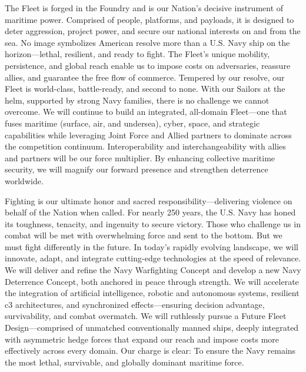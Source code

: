 \documentclass[../main.tex]{subfiles}
\begin{document}
\begin{description}[style=nextline, labelsep=0.5em, font=\bfseries]
\begin{description}[style=nextline, labelsep=0.5em, font=\bfseries]
          \item[\textbf{Fleet.}] The Fleet is forged in the Foundry and is our Nation's decisive instrument of maritime power. Comprised of people, platforms, and payloads, it is designed to deter aggression, project power, and secure our national interests on and from the sea. No image symbolizes American resolve more than a U.S. Navy ship on the horizon---lethal, resilient, and ready to fight. The Fleet's unique mobility, persistence, and global reach enable us to impose costs on adversaries, reassure allies, and guarantee the free flow of commerce. Tempered by our resolve, our Fleet is world-class, battle-ready, and second to none. With our Sailors at the helm, supported by strong Navy families, there is no challenge we cannot overcome. We will continue to build an integrated, all-domain Fleet---one that fuses maritime (surface, air, and undersea), cyber, space, and strategic capabilities while leveraging Joint Force and Allied partners to dominate across the competition continuum. Interoperability and interchangeability with allies and partners will be our force multiplier. By enhancing collective maritime security, we will magnify our forward presence and strengthen deterrence worldwide.

          \item[\textbf{Fight.}] Fighting is our ultimate honor and sacred responsibility---delivering violence on behalf of the Nation when called. For nearly 250 years, the U.S. Navy has honed its toughness, tenacity, and ingenuity to secure victory. Those who challenge us in combat will be met with overwhelming force and sent to the bottom. But we must fight differently in the future. In today's rapidly evolving landscape, we will innovate, adapt, and integrate cutting-edge technologies at the speed of relevance. We will deliver and refine the Navy Warfighting Concept and develop a new Navy Deterrence Concept, both anchored in peace through strength. We will accelerate the integration of artificial intelligence, robotic and autonomous systems, resilient \ac{c3} architectures, and synchronized effects---ensuring decision advantage, survivability, and combat overmatch. We will ruthlessly pursue a Future Fleet Design---comprised of unmatched conventionally manned ships, deeply integrated with asymmetric hedge forces that expand our reach and impose costs more effectively across every domain. Our charge is clear: To ensure the Navy remains the most lethal, survivable, and globally dominant maritime force.
        \end{description}


\end{description}
\end{document}
